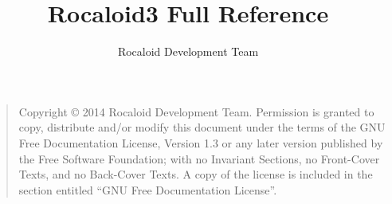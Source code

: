 

\author{Rocaloid Development Team}
\title{Rocaloid3 Full Reference}
\date{}



\maketitle

\newpage

\vspace*{\fill}
\begin{quote}
    Copyright \copyright{}  2014 Rocaloid Development Team.
    Permission is granted to copy, distribute and/or modify this document
    under the terms of the GNU Free Documentation License, Version 1.3
    or any later version published by the Free Software Foundation;
    with no Invariant Sections, no Front-Cover Texts, and no Back-Cover Texts.
    A copy of the license is included in the section entitled ``GNU
    Free Documentation License''.
\end{quote}
\vspace*{\fill}

\tableofcontents




